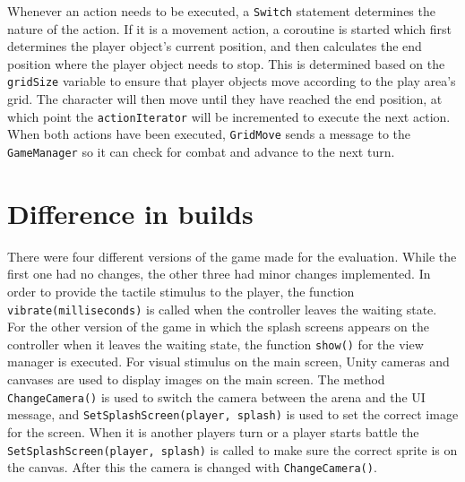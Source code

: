 Whenever an action needs to be executed, a \texttt{Switch} statement determines the nature of the action. If it is a movement action, a coroutine is started which first determines the player object's current position, and then calculates the end position where the player object needs to stop. This is determined based on the \texttt{gridSize} variable to ensure that player objects move according to the play area's grid. The character will then move until they have reached the end position, at which point the \texttt{actionIterator} will be incremented to execute the next action. When both actions have been executed, \texttt{GridMove} sends a message to the \texttt{GameManager} so it can check for combat and advance to the next turn.

\section{Difference in builds}
There were four different versions of the game made for the evaluation. While the first one had no changes, the other three had minor changes implemented. In order to provide the tactile stimulus to the player, the function \texttt{vibrate(milliseconds)} is called when the controller leaves the waiting state. For the other version of the game in which the splash screens appears on the controller when it leaves the waiting state, the function \texttt{show()} for the view manager is executed. For visual stimulus on the main screen, Unity cameras and canvases are used to display images on the main screen. The method \texttt{ChangeCamera()} is used to switch the camera between the arena and the UI message, and  \texttt{SetSplashScreen(player, splash)} is used to set the correct image for the screen. When it is another players turn or a player starts battle the \texttt{SetSplashScreen(player, splash)} is called to make sure the correct sprite is on the canvas. After this the camera is changed with \texttt{ChangeCamera()}.
